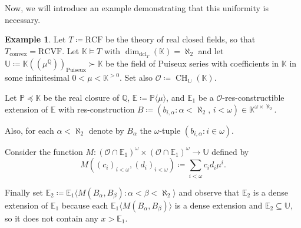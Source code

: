 \documentclass{amsart}
\theoremstyle{remark}
\theoremstyle{definition}
\newtheorem{example}[theorem]{Example}
\theoremstyle{plain}
\newcommand{\bE}{\mathbb E}
\newcommand{\bK}{\mathbb K}
\newcommand{\bP}{\mathbb P}
\newcommand{\bQ}{\mathbb Q}
\newcommand{\bU}{\mathbb U}
\newcommand{\cO}{\mathcal O}
\newcommand{\convex}{\mathrm{convex}}
\newcommand{\RCF}{\mathrm{RCF}}
\newcommand{\RCVF}{\mathrm{RCVF}}
\DeclareMathOperator{\dcl}{\mathrm{dcl}}
\DeclareMathOperator{\CH}{\mathrm{CH}}
\newcommand{\Lhp}{(\!(}
\newcommand{\Rhp}{)\!)}
\theoremstyle{plain}
\begin{document}
Now, we will introduce an example demonstrating that this uniformity is necessary.

\begin{example}\label{ex:Pathological}
   Let $T\coloneqq \RCF$ be the theory of real closed fields, so that $T_\convex = \RCVF$. Let $\bK \models T$ with $\dim_{\dcl_T}(\bK)=\aleph_2$ and let $\bU\coloneqq \bK\Lhp \mu^{\bQ}\Rhp_{\mathrm{Puiseux}}\succ \bK$ be the field of Puiseux series with coefficients in $\bK$ in some infinitesimal $0<\mu<\bK^{>0}$. Set also $\cO\coloneqq \CH_\bU(\bK)$.
   
   Let $\bP\preceq \bK$ be the real closure of $\bQ$, $\bE\coloneqq \bP \langle \mu\rangle$, and $\bE_1$ be a $\cO$-res-constructible extension of $\bE$ with res-construction $B\coloneqq (b_{i, \alpha}: \alpha< \aleph_2, \, i <\omega) \in \bK^{\omega \times \aleph_2}$.
   
   Also, for each $\alpha<\aleph_2$ denote by $B_\alpha$ the $\omega$-tuple $(b_{i, \alpha}: i\in \omega)$.
   
   Consider the function $M: (\cO\cap \bE_1)^\omega \times (\cO\cap \bE_1)^\omega \to \bU$ defined by \[M((c_i)_{i<\omega}, (d_i)_{i<\omega}) \coloneqq  \sum_{i<\omega} c_i d_i \mu^i.\]
   
   Finally set $\bE_2\coloneqq \bE_1\langle M(B_\alpha, B_\beta): \alpha < \beta <\aleph_2\rangle$ and observe that $\bE_2$ is a dense extension of $\bE_1$ because each $\bE_1 \langle M(B_\alpha, B_\beta)\rangle$ is a dense extension and $\bE_2\subseteq \bU$, so it does not contain any $x>\bE_1$.
\end{example}
\end{document}
